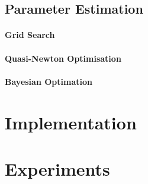 \documentclass[a4paper,oneside]{article}
\begin{document}
\subsection*{Parameter Estimation}
\paragraph{Grid Search}

\paragraph{Quasi-Newton Optimisation}

\paragraph{Bayesian Optimation}


\section*{Implementation}


\section*{Experiments}
\end{document}
